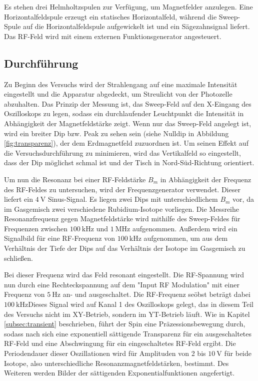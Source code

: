   Es stehen drei Helmholtzspulen zur Verfügung, um Magnetfelder anzulegen. Eine Horizontalfeldspule erzeugt ein statisches Horizontalfeld, während die Sweep-Spule auf die Horizontalfeldspule aufgewickelt ist und ein Sägezahnsignal liefert. Das RF-Feld wird mit einem externen Funktionsgenerator angesteuert.

  \subsection{Durchführung}

  Zu Beginn des Versuchs wird der Strahlengang auf eine maximale Intensität eingestellt und die Apparatur abgedeckt, um Streulicht von der Photozelle abzuhalten.
  Das Prinzip der Messung ist, das Sweep-Feld auf den X-Eingang des Oszilloskops zu legen, sodass ein durchlaufender Leuchtpunkt die Intensität in Abhängigkeit der Magnetfeldstärke zeigt.
  Wenn nur das Sweep-Feld angelegt ist, wird ein breiter Dip bzw. Peak zu sehen sein (siehe Nulldip in Abbildung \ref{fig:transparenz}), der dem Erdmagnetfeld zuzuordnen ist. Um seinen Effekt auf die Versuchsdurchführung zu minimieren, wird das Vertikalfeld so eingestellt, dass der Dip möglichst schmal ist und der Tisch in Nord-Süd-Richtung orientiert.

  Um nun die Resonanz bei einer RF-Feldstärke $B_m$ in Abhängigkeit der Frequenz des RF-Feldes zu untersuchen, wird der Frequenzgenerator verwendet. Dieser liefert ein $\SI{4}{\volt}$ Sinus-Signal. Es liegen zwei Dips mit unterschiedlichem $B_m$ vor, da im Gasgemisch zwei verschiedene Rubidium-Isotope vorliegen. Die Messreihe Resonanzfrequenz gegen Magnetfeldstärke wird mithilfe des Sweep-Feldes für Frequenzen zwischen $\SI{100}{\kilo\hertz}$ und $\SI{1}{\mega\hertz}$ aufgenommen.
  Außerdem wird ein Signalbild für eine RF-Frequenz von $\SI{100}{\kilo\hertz}$ aufgenommen, um aus dem Verhältnis der Tiefe der Dips auf das Verhältnis der Isotope im Gasgemisch zu schließen.

  Bei dieser Frequenz wird das Feld resonant eingestellt. Die RF-Spannung wird nun durch eine Rechteckspannung auf dem "Input RF Modulation" mit einer Frequenz von $\SI{5}{\hertz}$ an- und ausgeschaltet. Die RF-Frequenz seöbst beträgt dabei $\SI{100}{\kilo\hertz}$Dieses Signal wird auf Kanal 1 des Oszilloskops gelegt, das in diesem Teil des Versuchs nicht im XY-Betrieb, sondern im YT-Betrieb läuft. Wie in Kapitel \ref{subsec:transient} beschrieben, führt der Spin eine Präzessionsbewegung durch, sodass nach sich eine exponentiell sättigende Transparenz für ein ausgeschaltetes RF-Feld und eine Abschwingung für ein eingeschaltetes RF-Feld ergibt. Die Periodendauer dieser Oszillationen wird für Amplituden von 2 bis $\SI{10}{\volt}$ für beide Isotope, also unterschiedliche Resonanzmagnetfeldstärken, bestimmt.
  Des Weiteren werden Bilder der sättigenden Exponentialfunktionen angefertigt.
